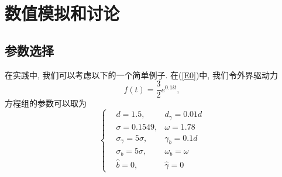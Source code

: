\documentclass[notitlepage,cs4size,punct,oneside]{ctexrep}
\numberwithin{equation}{section}
\theoremstyle{mystyle}
\begin{document}
\section{数值模拟和讨论}


\subsection{参数选择}
在实践中, 我们可以考虑以下的一个简单例子. 在(\ref{E0})中, 我们令外界驱动力
$$f(t) = \frac{3}{2}e^{0.1it},$$方程组的参数可以取为
\begin{equation} \label{parameters}
\left\{
\begin{aligned}
&d = 1.5,  &d_\gamma = 0.01d\\
&\sigma = 0.1549,& \omega = 1.78 \\
&\sigma_\gamma = 5\sigma, &\gamma_b = 0.1d \\
&\sigma_b = 5\sigma, &\omega_b = \omega \\
&\hat{b} = 0, &\hat\gamma = 0
\end{aligned}
\right.
\end{equation}
\end{document}
